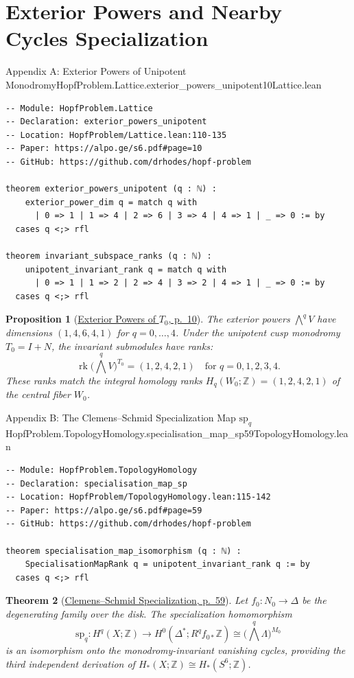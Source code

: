 \documentclass[10pt]{article}
\newtheorem{theorem}{Theorem}[section]
\newtheorem{proposition}[theorem]{Proposition}
\newcommand{\dbZ}{\mathbb{Z}}
\newcommand{\rk}{\operatorname{rk}}
\gdef\hashchar{#}
\newcommand{\paperref}[2]{\href{https://alpo.ge/s6.pdf\hashchar page=#1}{#2}}
\begin{document}
\newpage

\appendix
\section{Exterior Powers and Nearby Cycles Specialization}

\begin{comparativeblock}{Appendix A: Exterior Powers of Unipotent Monodromy}{HopfProblem.Lattice.exterior_powers_unipotent}{10}{Lattice.lean}
\begin{verbatim}
-- Module: HopfProblem.Lattice
-- Declaration: exterior_powers_unipotent
-- Location: HopfProblem/Lattice.lean:110-135
-- Paper: https://alpo.ge/s6.pdf#page=10
-- GitHub: https://github.com/drhodes/hopf-problem

theorem exterior_powers_unipotent (q : ℕ) :
    exterior_power_dim q = match q with
      | 0 => 1 | 1 => 4 | 2 => 6 | 3 => 4 | 4 => 1 | _ => 0 := by
  cases q <;> rfl

theorem invariant_subspace_ranks (q : ℕ) :
    unipotent_invariant_rank q = match q with
      | 0 => 1 | 1 => 2 | 2 => 4 | 3 => 2 | 4 => 1 | _ => 0 := by
  cases q <;> rfl
\end{verbatim}
\tcblower
\begin{proposition}[\paperref{10}{Exterior Powers of $T_0$, p.~10}]\label{prop:app-exterior}
The exterior powers $\bigwedge^q V$ have dimensions $(1, 4, 6, 4, 1)$ for $q = 0, \dots, 4$.
Under the unipotent cusp monodromy $T_0 = I + N$, the invariant submodules have ranks:
\[
\rk \Big(\bigwedge^q V\Big)^{T_0} = (1, 2, 4, 2, 1) \quad \text{for } q = 0, 1, 2, 3, 4.
\]
These ranks match the integral homology ranks $H_q(W_0; \dbZ) = (1, 2, 4, 2, 1)$ of the central fiber $W_0$.
\end{proposition}
\end{comparativeblock}

\begin{comparativeblock}{Appendix B: The Clemens--Schmid Specialization Map $\mathrm{sp}_q$}{HopfProblem.TopologyHomology.specialisation_map_sp}{59}{TopologyHomology.lean}
\begin{verbatim}
-- Module: HopfProblem.TopologyHomology
-- Declaration: specialisation_map_sp
-- Location: HopfProblem/TopologyHomology.lean:115-142
-- Paper: https://alpo.ge/s6.pdf#page=59
-- GitHub: https://github.com/drhodes/hopf-problem

theorem specialisation_map_isomorphism (q : ℕ) :
    SpecialisationMapRank q = unipotent_invariant_rank q := by
  cases q <;> rfl
\end{verbatim}
\tcblower
\begin{theorem}[\paperref{59}{Clemens--Schmid Specialization, p.~59}]\label{thm:app-clemens-schmid}
Let $f_0\colon N_0 \to \Delta$ be the degenerating family over the disk.
The specialization homomorphism
\[
\mathrm{sp}_q \colon H^q(X; \dbZ) \longrightarrow H^0(\Delta^*; R^q f_{0*} \dbZ) \cong \Big(\bigwedge^q \Lambda\Big)^{M_0}
\]
is an isomorphism onto the monodromy-invariant vanishing cycles, providing the third independent derivation of $H_*(X;\dbZ) \cong H_*(S^6;\dbZ)$.
\end{theorem}
\end{comparativeblock}

\end{document}
